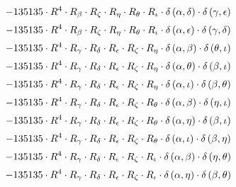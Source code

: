 \begin{subequations}
\begin{gather}
 \\[0.2em] \notag 		 - 135135 \cdot R^{4} \cdot R_{\beta{}} \cdot R_{\zeta{}} \cdot R_{\eta{}} \cdot R_{\theta{}} \cdot R_{\iota{}} \cdot \delta{}\left(\alpha{}, \delta{}\right) \cdot \delta{}\left(\gamma{}, \epsilon{}\right) 
 \\[0.2em] \notag 		 - 135135 \cdot R^{4} \cdot R_{\beta{}} \cdot R_{\zeta{}} \cdot R_{\eta{}} \cdot R_{\theta{}} \cdot R_{\iota{}} \cdot \delta{}\left(\alpha{}, \epsilon{}\right) \cdot \delta{}\left(\gamma{}, \delta{}\right) 
 \\[0.2em] \notag 		 - 135135 \cdot R^{4} \cdot R_{\gamma{}} \cdot R_{\delta{}} \cdot R_{\epsilon{}} \cdot R_{\zeta{}} \cdot R_{\eta{}} \cdot \delta{}\left(\alpha{}, \beta{}\right) \cdot \delta{}\left(\theta{}, \iota{}\right) 
 \\[0.2em] \notag 		 - 135135 \cdot R^{4} \cdot R_{\gamma{}} \cdot R_{\delta{}} \cdot R_{\epsilon{}} \cdot R_{\zeta{}} \cdot R_{\eta{}} \cdot \delta{}\left(\alpha{}, \theta{}\right) \cdot \delta{}\left(\beta{}, \iota{}\right) 
 \\[0.2em] \notag 		 - 135135 \cdot R^{4} \cdot R_{\gamma{}} \cdot R_{\delta{}} \cdot R_{\epsilon{}} \cdot R_{\zeta{}} \cdot R_{\eta{}} \cdot \delta{}\left(\alpha{}, \iota{}\right) \cdot \delta{}\left(\beta{}, \theta{}\right) 
 \\[0.2em] \notag 		 - 135135 \cdot R^{4} \cdot R_{\gamma{}} \cdot R_{\delta{}} \cdot R_{\epsilon{}} \cdot R_{\zeta{}} \cdot R_{\theta{}} \cdot \delta{}\left(\alpha{}, \beta{}\right) \cdot \delta{}\left(\eta{}, \iota{}\right) 
 \\[0.2em] \notag 		 - 135135 \cdot R^{4} \cdot R_{\gamma{}} \cdot R_{\delta{}} \cdot R_{\epsilon{}} \cdot R_{\zeta{}} \cdot R_{\theta{}} \cdot \delta{}\left(\alpha{}, \eta{}\right) \cdot \delta{}\left(\beta{}, \iota{}\right) 
 \\[0.2em] \notag 		 - 135135 \cdot R^{4} \cdot R_{\gamma{}} \cdot R_{\delta{}} \cdot R_{\epsilon{}} \cdot R_{\zeta{}} \cdot R_{\theta{}} \cdot \delta{}\left(\alpha{}, \iota{}\right) \cdot \delta{}\left(\beta{}, \eta{}\right) 
 \\[0.2em] \notag 		 - 135135 \cdot R^{4} \cdot R_{\gamma{}} \cdot R_{\delta{}} \cdot R_{\epsilon{}} \cdot R_{\zeta{}} \cdot R_{\iota{}} \cdot \delta{}\left(\alpha{}, \beta{}\right) \cdot \delta{}\left(\eta{}, \theta{}\right) 
 \\[0.2em] \notag 		 - 135135 \cdot R^{4} \cdot R_{\gamma{}} \cdot R_{\delta{}} \cdot R_{\epsilon{}} \cdot R_{\zeta{}} \cdot R_{\iota{}} \cdot \delta{}\left(\alpha{}, \eta{}\right) \cdot \delta{}\left(\beta{}, \theta{}\right) 

\end{gather}
\end{subequations}
